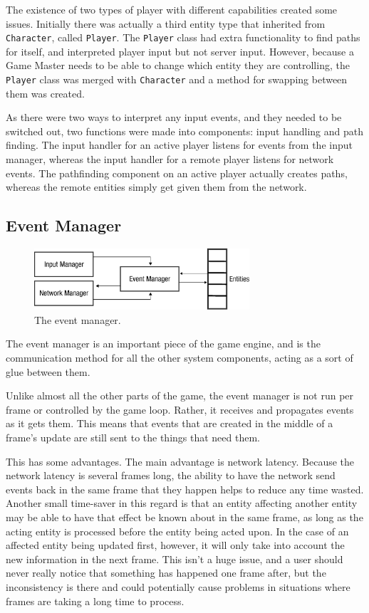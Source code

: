 The existence of two types of player with different capabilities created some issues. Initially there was actually a third entity type that inherited from \texttt{Character}, called \texttt{Player}. The \texttt{Player} class had extra functionality to find paths for itself, and interpreted player input but not server input. However, because a Game Master needs to be able to change which entity they are controlling, the \texttt{Player} class was merged with \texttt{Character} and a method for swapping between them was created.

As there were two ways to interpret any input events, and they needed to be switched out, two functions were made into components: input handling and path finding. The input handler for an active player listens for events from the input manager, whereas the input handler for a remote player listens for network events. The pathfinding component on an active player actually creates paths, whereas the remote entities simply get given them from the network.

\subsection{Event Manager}\label{subsection:eventmanager}

\begin{figure}[H]
	\centering
	\includegraphics[width=8cm]{Images/event_manager.eps}
	\caption{The event manager.}
    \label{fig:event_manager}
\end{figure}

The event manager is an important piece of the game engine, and is the communication method for all the other system components, acting as a sort of glue between them.

Unlike almost all the other parts of the game, the event manager is not run per frame or controlled by the game loop. Rather, it receives and propagates events as it gets them. This means that events that are created in the middle of a frame's update are still sent to the things that need them.

This has some advantages. The main advantage is network latency. Because the network latency is several frames long, the ability to have the network send events back in the same frame that they happen helps to reduce any time wasted. Another small time-saver in this regard is that an entity affecting another entity may be able to have that effect be known about in the same frame, as long as the acting entity is processed before the entity being acted upon. In the case of an affected entity being updated first, however, it will only take into account the new information in the next frame. This isn't a huge issue, and a user should never really notice that something has happened one frame after, but the inconsistency is there and could potentially cause problems in situations where frames are taking a long time to process.

